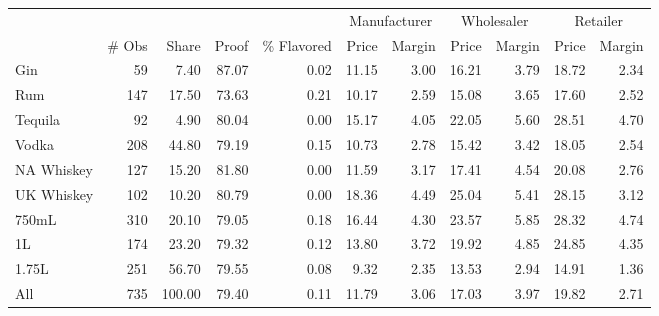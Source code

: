 \begin{tabular}{lrrrrrrrrrr}
\toprule
 &&&&& \multicolumn{2}{c}{ Manufacturer } & \multicolumn{2}{c}{ Wholesaler }& \multicolumn{2}{c}{ Retailer } \\ 
 & \# Obs & Share & Proof & \% Flavored & Price & Margin & Price & Margin & Price & Margin \\
\midrule
Gin & 59 & 7.40 & 87.07 & 0.02 & 11.15 & 3.00 & 16.21 & 3.79 & 18.72 & 2.34 \\
Rum & 147 & 17.50 & 73.63 & 0.21 & 10.17 & 2.59 & 15.08 & 3.65 & 17.60 & 2.52 \\
Tequila & 92 & 4.90 & 80.04 & 0.00 & 15.17 & 4.05 & 22.05 & 5.60 & 28.51 & 4.70 \\
Vodka & 208 & 44.80 & 79.19 & 0.15 & 10.73 & 2.78 & 15.42 & 3.42 & 18.05 & 2.54 \\
NA Whiskey & 127 & 15.20 & 81.80 & 0.00 & 11.59 & 3.17 & 17.41 & 4.54 & 20.08 & 2.76 \\
UK Whiskey & 102 & 10.20 & 80.79 & 0.00 & 18.36 & 4.49 & 25.04 & 5.41 & 28.15 & 3.12 \\
\midrule
750mL & 310 & 20.10 & 79.05 & 0.18 & 16.44 & 4.30 & 23.57 & 5.85 & 28.32 & 4.74 \\
1L & 174 & 23.20 & 79.32 & 0.12 & 13.80 & 3.72 & 19.92 & 4.85 & 24.85 & 4.35 \\
1.75L & 251 & 56.70 & 79.55 & 0.08 & 9.32 & 2.35 & 13.53 & 2.94 & 14.91 & 1.36 \\
\midrule
All & 735 & 100.00 & 79.40 & 0.11 & 11.79 & 3.06 & 17.03 & 3.97 & 19.82 & 2.71 \\
\bottomrule
\end{tabular}
